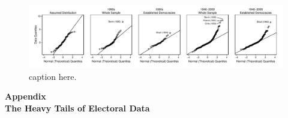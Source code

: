 \documentclass[12pt]{article}
\begin{document}
\begin{figure}[H]
\begin{center}
\includegraphics[width = \textwidth]{figs/cg-qq-plots.pdf}
\caption{caption here.}\label{fig:cg-coef-plots}
\end{center}
\end{figure}

\newpage
\doublespace
\begin{appendix}
\begin{center}
\textbf{{\LARGE Appendix}}\\\vspace{2mm}
\textbf{{\large The Heavy Tails of Electoral Data}}\\\vspace{2mm}

\end{center}
\section{}


\end{appendix}
\end{document}
